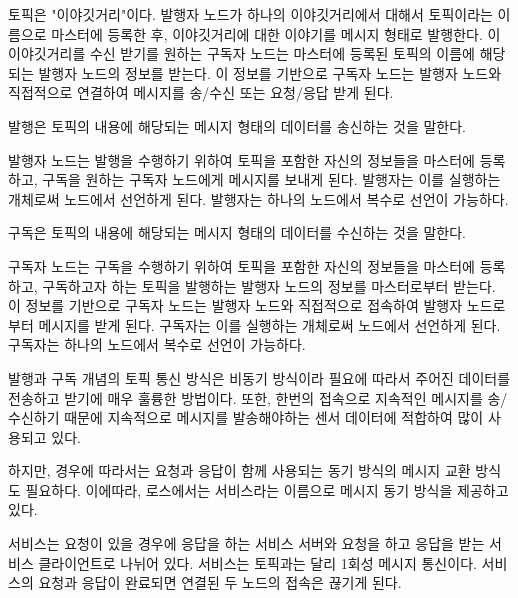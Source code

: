 \begin{definition}[토픽(topic)]\label{def:RosTopic}
토픽은 "이야깃거리"이다. 발행자 노드가 하나의 이야깃거리에서 대해서 토픽이라는 이름으로 마스터에 등록한 후, 이야깃거리에 대한 이야기를 메시지 형태로 발행한다. 이 이야깃거리를 수신 받기를 원하는 구독자 노드는 마스터에 등록된 토픽의 이름에 해당되는 발행자 노드의 정보를 받는다. 이 정보를 기반으로 구독자 노드는 발행자 노드와 직접적으로 연결하여 메시지를 송/수신 또는 요청/응답 받게 된다. 
\end{definition}

\begin{definition}\label{def:RosPublish}
발행은 토픽의 내용에 해당되는 메시지 형태의 데이터를 송신하는 것을 말한다. 

발행자 노드는 발행을 수행하기 위하여 토픽을 포함한 자신의 정보들을 마스터에 등록하고, 구독을 원하는 구독자 노드에게 메시지를 보내게 된다. 발행자는 이를 실행하는 개체로써 노드에서 선언하게 된다. 발행자는 하나의 노드에서 복수로 선언이 가능하다.
\end{definition}

\begin{definition}\label{def:RosSubscribe}
구독은 토픽의 내용에 해당되는 메시지 형태의 데이터를 수신하는 것을 말한다. 

구독자 노드는 구독을 수행하기 위하여 토픽을 포함한 자신의 정보들을 마스터에 등록하고, 구독하고자 하는 토픽을 발행하는 발행자 노드의 정보를 마스터로부터 받는다. 이 정보를 기반으로 구독자 노드는 발행자 노드와 직접적으로 접속하여 발행자 노드로부터 메시지를 받게 된다. 구독자는 이를 실행하는 개체로써 노드에서 선언하게 된다. 구독자는 하나의 노드에서 복수로 선언이 가능하다.
\end{definition}

\begin{definition}\label{def:RosService}
발행과 구독 개념의 토픽 통신 방식은 비동기 방식이라 필요에 따라서 주어진 데이터를 전송하고 받기에 매우 훌륭한 방법이다. 또한, 한번의 접속으로 지속적인 메시지를 송/수신하기 때문에 지속적으로 메시지를 발송해야하는 센서 데이터에 적합하여 많이 사용되고 있다. 

하지만, 경우에 따라서는 요청과 응답이 함께 사용되는 동기 방식의 메시지 교환 방식도 필요하다. 이에따라, 로스에서는 서비스라는 이름으로 메시지 동기 방식을 제공하고 있다. 

서비스는 요청이 있을 경우에 응답을 하는 서비스 서버와 요청을 하고 응답을 받는 서비스 클라이언트로 나뉘어 있다. 서비스는 토픽과는 달리 1회성 메시지 통신이다. 서비스의 요청과 응답이 완료되면 연결된 두 노드의 접속은 끊기게 된다. 
\end{definition}


